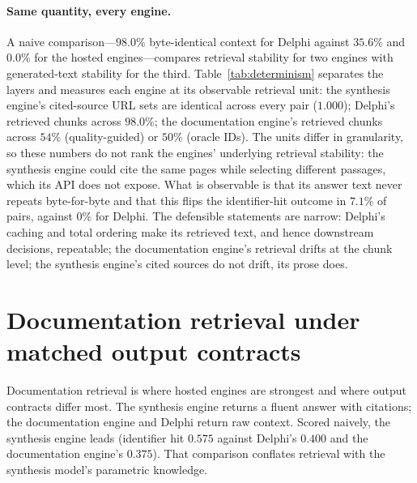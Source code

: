 \documentclass{article}
\newcommand{\system}{Delphi}
\begin{document}
\paragraph{Same quantity, every engine.} A naive comparison---$98.0\%$ byte-identical context for \system{} against $35.6\%$ and $0.0\%$ for the hosted engines---compares retrieval stability for two engines with generated-text stability for the third. Table~\ref{tab:determinism} separates the layers and measures each engine at its observable retrieval unit: the synthesis engine's cited-source URL sets are identical across every pair ($1.000$); \system{}'s retrieved chunks across $98.0\%$; the documentation engine's retrieved chunks across $54\%$ (quality-guided) or $50\%$ (oracle IDs). The units differ in granularity, so these numbers do not rank the engines' underlying retrieval stability: the synthesis engine could cite the same pages while selecting different passages, which its API does not expose. What is observable is that its answer text never repeats byte-for-byte and that this flips the identifier-hit outcome in $7.1\%$ of pairs, against $0\%$ for \system{}. The defensible statements are narrow: \system{}'s caching and total ordering make its retrieved text, and hence downstream decisions, repeatable; the documentation engine's retrieval drifts at the chunk level; the synthesis engine's cited sources do not drift, its prose does.

\section{Documentation retrieval under matched output contracts}
\label{sec:docs}

Documentation retrieval is where hosted engines are strongest and where output contracts differ most. The synthesis engine returns a fluent answer with citations; the documentation engine and \system{} return raw context. Scored naively, the synthesis engine leads (identifier hit $0.575$ against \system{}'s $0.400$ and the documentation engine's $0.375$). That comparison conflates retrieval with the synthesis model's parametric knowledge.
\end{document}
